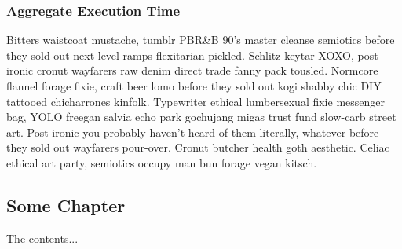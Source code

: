 \documentclass[12pt]{article}
\begin{document}
\subsection{Aggregate Execution Time}
Bitters waistcoat mustache, tumblr PBR&B 90's master cleanse semiotics before they sold out next level ramps flexitarian pickled. Schlitz keytar XOXO, post-ironic cronut wayfarers raw denim direct trade fanny pack tousled. Normcore flannel forage fixie, craft beer lomo before they sold out kogi shabby chic DIY tattooed chicharrones kinfolk. Typewriter ethical lumbersexual fixie messenger bag, YOLO freegan salvia echo park gochujang migas trust fund slow-carb street art. Post-ironic you probably haven't heard of them literally, whatever before they sold out wayfarers pour-over. Cronut butcher health goth aesthetic. Celiac ethical art party, semiotics occupy man bun forage vegan kitsch.


\newpage

\begin{appendices}
\chapter{Some Chapter}
The contents...
\end{appendices}
\end{document}
